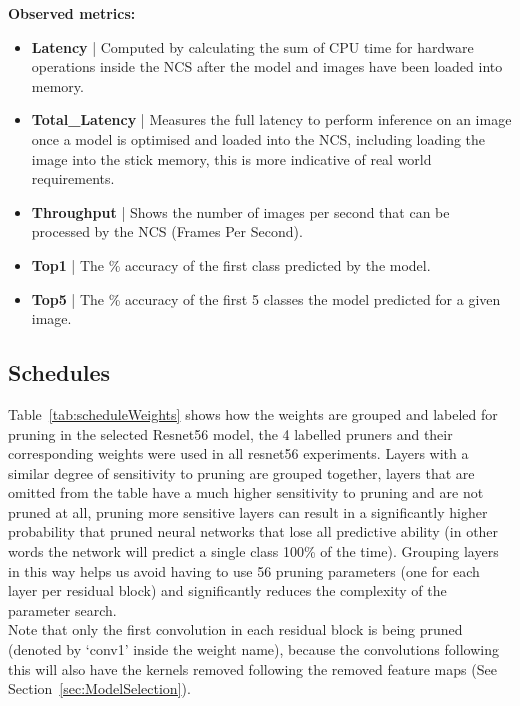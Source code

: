 \documentclass[../Dissertation.tex]{subfiles}
\begin{document}
\singlespacing
\noindent\textbf{Observed metrics:}
\begin{itemize}
    \item \textbf{Latency} | Computed by calculating the sum of CPU time for hardware operations inside the NCS after the model and images have been loaded into memory.
    \item \textbf{Total\_Latency} | Measures the full latency to perform inference on an image once a model is optimised and loaded into the NCS, including loading the image into the stick memory, this is more indicative of real world requirements.
    \item \textbf{Throughput} | Shows the number of images per second that can be processed by the NCS (Frames Per Second).
    \item \textbf{Top1} | The \% accuracy of the first class predicted by the model.
    \item \textbf{Top5} | The \% accuracy of the first 5 classes the model predicted for a given image.
\end{itemize}
\doublespacing

\newpage
\subsection{Schedules}
Table~\ref{tab:scheduleWeights} shows how the weights are grouped and labeled for pruning in the selected Resnet56 model, the 4 labelled pruners and their corresponding weights were used in all resnet56 experiments.
Layers with a similar degree of sensitivity to pruning are grouped together, layers that are omitted from the table have a much higher sensitivity to pruning and are not pruned at all, pruning more sensitive layers can result in a significantly higher probability that pruned neural networks that lose all predictive ability (in other words the network will predict a single class 100\% of the time).
Grouping layers in this way helps us avoid having to use 56 pruning parameters (one for each layer per residual block) and significantly reduces the complexity of the parameter search.\\

Note that only the first convolution in each residual block is being pruned (denoted by `conv1' inside the weight name), because the convolutions following this will also have the kernels removed following the removed feature maps (See Section~\ref{sec:ModelSelection}).
\end{document}
